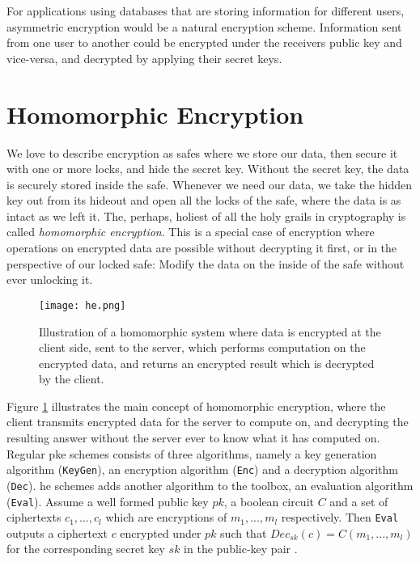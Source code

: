 For applications using databases that are storing information for different users, asymmetric encryption would be a natural encryption scheme. Information sent from one user to another could be encrypted under the receivers public key and vice-versa, and decrypted by applying their secret keys.

\section{Homomorphic Encryption}

We love to describe encryption as safes where we store our data, then secure it with one or more locks, and hide the secret key. Without the secret key, the data is securely stored inside the safe. Whenever we need our data, we take the hidden key out from its hideout and open all the locks of the safe, where the data is as intact as we left it. The, perhaps, holiest of all the holy grails in cryptography is called \emph{homomorphic encryption}. This is a special case of encryption where operations on encrypted data are possible without decrypting it first, or in the perspective of our locked safe: Modify the data on the inside of the safe without ever unlocking it.

\begin{figure}[h]
	\centering
	\texttt{[image: he.png]}
	\caption{Illustration of a homomorphic system where data is encrypted at the client side, sent to the server, which performs computation on the encrypted data, and returns an encrypted result which is decrypted by the client.}
	\label{fig:he_ill}
\end{figure}

Figure \ref{fig:he_ill} illustrates the main concept of homomorphic encryption, where the client transmits encrypted data for the server to compute on, and decrypting the resulting answer without the server ever to know what it has computed on. Regular \gls{pke} schemes consists of three algorithms, namely a key generation algorithm (\texttt{KeyGen}), an encryption algorithm (\texttt{Enc}) and a decryption algorithm (\texttt{Dec}). \gls{he} schemes adds another algorithm to the toolbox, an evaluation algorithm (\texttt{Eval}).  Assume a well formed public key $pk$, a boolean circuit $C$ and a set of ciphertexts $c_1, ..., c_l$ which are encryptions of $m_1, ..., m_l$ respectively. Then \texttt{Eval} outputs a ciphertext $c$ encrypted under $pk$ such that $Dec_{sk}(c) = C(m_1, ..., m_l)$ for the corresponding secret key $sk$ in the public-key pair \cite{damgaard2012secure}.


